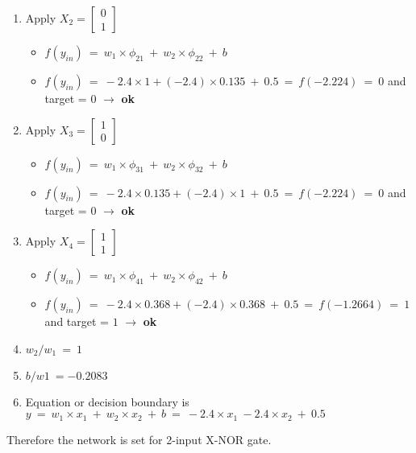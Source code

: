 \documentclass[12pt]{article}
\begin{document}
\begin{itemize}
\begin{enumerate}
\begin{itemize}[label=$\rightarrow$]
		\end{itemize}
		
		\BlankLine\BlankLine\BlankLine\BlankLine\BlankLine
		\item Apply $X_2 = \begin{bmatrix}
			0 \\ 1
		\end{bmatrix}$ 
		
		\begin{itemize}[label=$\rightarrow$]
			\item $f(y_{in}) \ = \ w_1 \times \phi_{21} \ + \ w_2 \times \phi_{22}  \ + \ b $ 
			\item $ f(y_{in}) \ = \ -2.4 \times 1 + (-2.4) \times 0.135 \ + \ 0 .5\ = \ f(-2.224) \ = \ 0$  and target = $0$ $\rightarrow$  \textbf{ok}
			
		\end{itemize}
	
		\item Apply $X_3 = \begin{bmatrix}
			1 \\ 0
		\end{bmatrix}$ 
		
		\begin{itemize}[label=$\rightarrow$]
			\item $f(y_{in}) \ = \ w_1 \times \phi_{31} \ + \ w_2 \times \phi_{32}  \ + \ b $ 
			\item $ f(y_{in}) \ = \ -2.4 \times 0.135 + (-2.4) \times 1 \ + \ 0.5 \ = \ f(-2.224) \ = \ 0$  and target = $0$ $\rightarrow$  \textbf{ok}
			
		\end{itemize}
	
		\item Apply $X_4 = \begin{bmatrix}
			1 \\ 1
		\end{bmatrix}$ 
		
		\begin{itemize}[label=$\rightarrow$]
			\item $f(y_{in}) \ = \ w_1 \times \phi_{41} \ + \ w_2 \times \phi_{42}  \ + \ b $ 
			\item $ f(y_{in}) \ = \ -2.4 \times 0.368 + (-2.4) \times 0.368 \ + \ 0.5 \ = \ f(-1.2664) \ = \ 1$  and target = $1$ $\rightarrow$  \textbf{ok}
			
		\end{itemize}
	
		\item $w_2/w_1 \ = \ 1$
		\item $b/w1 \ = -0.2083$
		
		\item Equation or decision boundary is $ y \ = \ w_1 \times x_1 \ + \ w_2 \times x_2 \ + \ b \ = \ -2.4 \times x_1 \ -2.4 \times x_2 \ + \ 0.5 $
		
	\end{enumerate}
	
\end{itemize}

Therefore the network is set for 2-input X-NOR gate.
\end{document}
